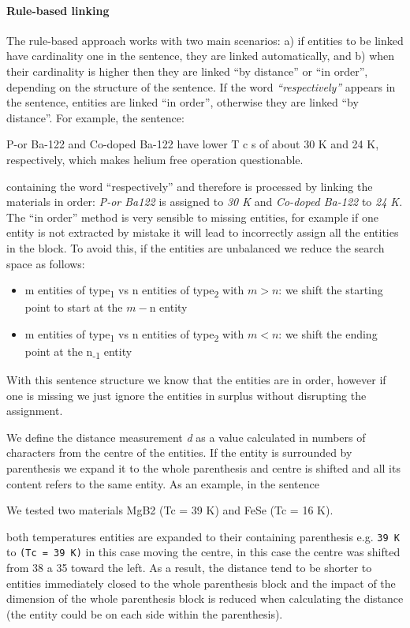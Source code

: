 \documentclass{article}
\begin{document}
\paragraph{Rule-based linking}
The rule-based approach works with two main scenarios: a) if entities to be linked have cardinality one in the sentence, they are linked automatically, and b) when their cardinality is higher then they are linked ``by distance'' or ``in order'', depending on the structure of the sentence. 
If the word \textit{``respectively''} appears in the sentence, entities are linked ``in order'', otherwise they are linked ``by distance''. 
For example, the sentence:  
\begin{displayquote}
P-or Ba-122  and Co-doped Ba-122 have lower T c s of about 30 K and 24 K, respectively, which makes helium free operation questionable.
\end{displayquote}
containing the word ``respectively'' and therefore is processed by linking the materials in order: \textit{P-or Ba122} is assigned to \textit{30 K} and \textit{Co-doped Ba-122} to \textit{24 K}.
The ``in order'' method is very sensible to missing entities, for example if one entity is not extracted by mistake it will lead to incorrectly assign all the entities in the block. To avoid this, if the entities are unbalanced we reduce the search space as follows: 
\begin{itemize}
    \item m entities of type\textsubscript{1} vs n entities of type\textsubscript{2} with $m > n$: we shift the starting point to start at the $m - $n entity 
    \item m entities of type\textsubscript{1} vs n entities of type\textsubscript{2} with $m < n$: we shift the ending point at the n\textsubscript{-1} entity
\end{itemize}
With this sentence structure we know that the entities are in order, however if one is missing we just ignore the entities in surplus without disrupting the assignment. 

We define the distance measurement \textit{d} as a value calculated in numbers of characters from the centre of the entities. 
If the entity is surrounded by parenthesis we expand it to the whole parenthesis and centre is shifted and all its content refers to the same entity. 
As an example, in the sentence
\begin{displayquote}
We tested two materials MgB2 (Tc = 39 K) and FeSe (Tc = 16 K).
\end{displayquote}
both temperatures entities are expanded to their containing parenthesis e.g. \texttt{39 K} to \texttt{(Tc = 39 K)} in this case moving the centre, in this case the centre was shifted from 38 a 35 toward the left.
As a result, the distance tend to be shorter to entities immediately closed to the whole parenthesis block and the impact of the dimension of the whole parenthesis block is reduced when calculating the distance (the entity could be on each side within the parenthesis). 
\end{document}
